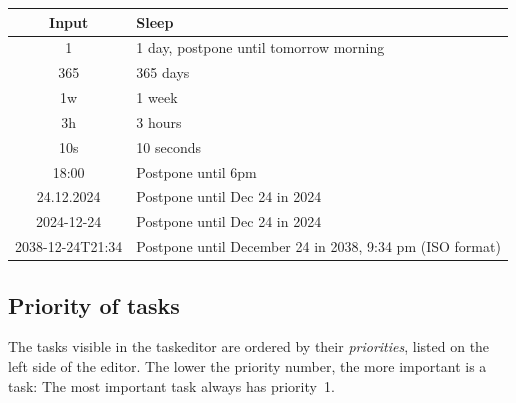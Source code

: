 \documentclass[12pt,a4paper]{article}
\begin{document}
\begin{center}
    \begin{tabular}{|c|p{11cm}|} \hline
        {\bf Input }   & {\bf Sleep} \\ \hline
        1       & 1 day, postpone until tomorrow morning\\
        365     & 365 days \\
        1w      & 1 week \\
        3h      & 3 hours \\
        10s     & 10 seconds \\
        18:00   & Postpone until 6pm \\
        24.12.2024  & Postpone until Dec 24 in 2024 \\
        2024-12-24  & Postpone until Dec 24 in 2024 \\ 
        2038-12-24T21:34 &  Postpone until December 24 in 2038, 9:34 pm (ISO format)  \\ \hline
    \end{tabular}
\end{center}


\subsection{Priority of tasks}
The tasks visible in the taskeditor are ordered by their {\em
priorities}, listed on the left side of the editor. The lower the
priority number, the more important is a task: The most important task always has priority~1.
\end{document}
